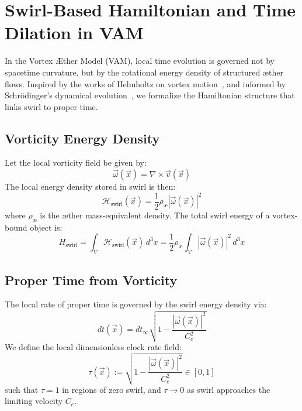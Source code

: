 \section{Swirl-Based Hamiltonian and Time Dilation in VAM}
\label{sec:swirl_hamiltonian}

In the Vortex \AE ther Model (VAM), local time evolution is governed not by spacetime curvature, but by the rotational energy density of structured æther flows. Inspired by the works of Helmholtz on vortex motion~\cite{Helmholtz1858}, and informed by Schrödinger's dynamical evolution~\cite{Schrodinger1926}, we formalize the Hamiltonian structure that links swirl to proper time.

\subsection{Vorticity Energy Density}

Let the local vorticity field be given by:
\begin{equation}
    \vec{\omega}(\vec{x}) = \nabla \times \vec{v}(\vec{x})
\end{equation}
The local energy density stored in swirl is then:
\begin{equation}
    \mathcal{H}_{\text{swirl}}(\vec{x}) = \frac{1}{2} \rho_\text{\ae} |\vec{\omega}(\vec{x})|^2
\end{equation}
where \( \rho_\text{\ae} \) is the æther mass-equivalent density. The total swirl energy of a vortex-bound object is:
\begin{equation}
    H_{\text{swirl}} = \int_V \mathcal{H}_{\text{swirl}}(\vec{x}) \, d^3x = \frac{1}{2} \rho_\text{\ae} \int_V |\vec{\omega}(\vec{x})|^2 \, d^3x
\end{equation}

\subsection{Proper Time from Vorticity}

The local rate of proper time is governed by the swirl energy density via:
\begin{equation}
    dt(\vec{x}) = dt_\infty \sqrt{1 - \frac{|\vec{\omega}(\vec{x})|^2}{C_e^2}}
\end{equation}
We define the local dimensionless clock rate field:
\begin{equation}
    \tau(\vec{x}) := \sqrt{1 - \frac{|\vec{\omega}(\vec{x})|^2}{C_e^2}} \in [0,1]
\end{equation}
such that \( \tau = 1 \) in regions of zero swirl, and \( \tau \to 0 \) as swirl approaches the limiting velocity \( C_e \).


